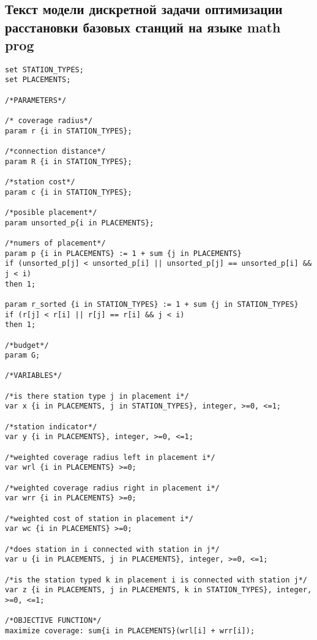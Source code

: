 \appendix
\chapter{} \label{AppendixA}
\section{Текст модели дискретной задачи оптимизации расстановки базовых станций на языке math prog}  \label{model_text}
\begin{verbatim}
set STATION_TYPES;
set PLACEMENTS;

/*PARAMETERS*/

/* coverage radius*/
param r {i in STATION_TYPES};

/*connection distance*/
param R {i in STATION_TYPES};

/*station cost*/
param c {i in STATION_TYPES};

/*posible placement*/
param unsorted_p{i in PLACEMENTS};

/*numers of placement*/
param p {i in PLACEMENTS} := 1 + sum {j in PLACEMENTS} 
if (unsorted_p[j] < unsorted_p[i] || unsorted_p[j] == unsorted_p[i] && j < i) 
then 1;

param r_sorted {i in STATION_TYPES} := 1 + sum {j in STATION_TYPES}
if (r[j] < r[i] || r[j] == r[i] && j < i)
then 1;

/*budget*/
param G;

/*VARIABLES*/

/*is there station type j in placement i*/
var x {i in PLACEMENTS, j in STATION_TYPES}, integer, >=0, <=1;

/*station indicator*/
var y {i in PLACEMENTS}, integer, >=0, <=1;

/*weighted coverage radius left in placement i*/
var wrl {i in PLACEMENTS} >=0;

/*weighted coverage radius right in placement i*/
var wrr {i in PLACEMENTS} >=0;

/*weighted cost of station in placement i*/
var wc {i in PLACEMENTS} >=0;

/*does station in i connected with station in j*/
var u {i in PLACEMENTS, j in PLACEMENTS}, integer, >=0, <=1;

/*is the station typed k in placement i is connected with station j*/
var z {i in PLACEMENTS, j in PLACEMENTS, k in STATION_TYPES}, integer, >=0, <=1;

/*OBJECTIVE FUNCTION*/
maximize coverage: sum{i in PLACEMENTS}(wrl[i] + wrr[i]);


\end{verbatim}
